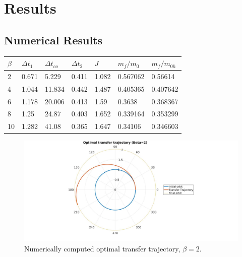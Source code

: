 \chapter{Results}
\section{Numerical Results}

\begin{table}[H]
  \centering
  \begin{tabular}{@{}lllllll@{}}
  \toprule
  $\beta$ & $\Delta t_1$ & $\Delta t_{co}$ & $\Delta t_2$ & $J$ & $m_f/m_0$ & $m_f/m_{0h}$ \\ \midrule
  2 & 0.671 & 5.229 & 0.411 & 1.082 & 0.567062 & 0.56614 \\
  4 & 1.044 & 11.834 & 0.442 & 1.487 & 0.405365 & 0.407642 \\
  6 & 1.178 & 20.006 & 0.413 & 1.59 & 0.3638 & 0.368367 \\
  8 & 1.25 & 24.87 & 0.403 & 1.652 & 0.339164 & 0.353299 \\
  10 & 1.282 & 41.08 & 0.365 & 1.647 & 0.34106 & 0.346603 \\ \bottomrule
  \end{tabular}
  \end{table}

\begin{figure}[H]
    \includegraphics[width=\linewidth]{./jpgs/thrustArcB2.jpg}
    \caption{Numerically computed optimal transfer trajectory, $\beta = 2$.}
    \label{fig:Tarc-B2}
  \end{figure}


